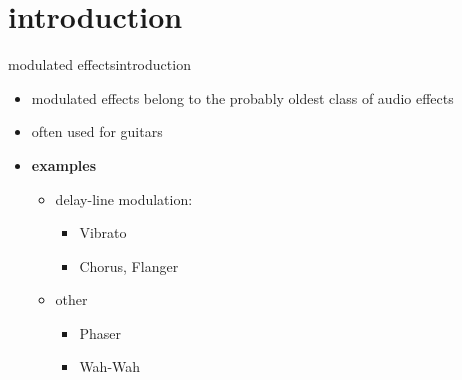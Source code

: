 



\subtitle{Part 19: Modulated Effects}


	

    \section[intro]{introduction}
        \begin{frame}{modulated effects}{introduction}
			
			\begin{itemize}
                \item   modulated effects belong to the probably oldest class of audio effects
                \item   often used for guitars
				\item<2->	\textbf{examples}
					\begin{itemize}
						\item	delay-line modulation:
                            \begin{itemize}
                                \item Vibrato
                                \item   Chorus, Flanger
                            \end{itemize}
                        \item   other
                            \begin{itemize}
                                \item Phaser
                                \item   Wah-Wah
                            \end{itemize}
					\end{itemize}
			\end{itemize}
		\end{frame}


